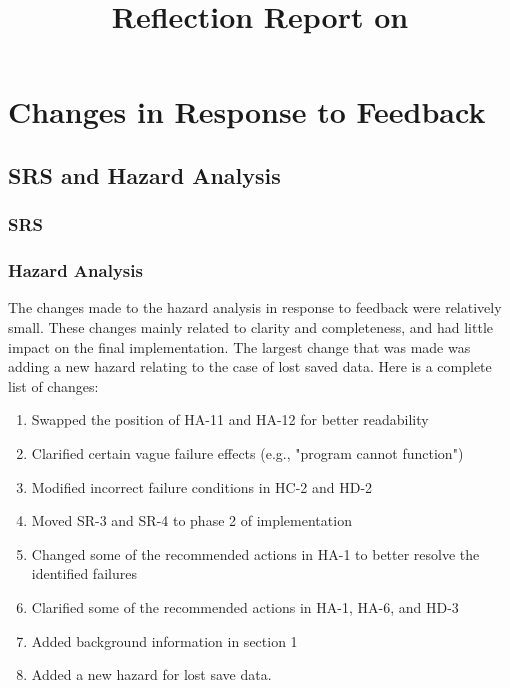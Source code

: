 \documentclass{article}
\title{Reflection Report on \progname}
\author{\authname}
\date{}
\begin{document}
\maketitle


\section{Changes in Response to Feedback}



\subsection{SRS and Hazard Analysis}
\subsubsection{SRS}

\subsubsection{Hazard Analysis}
The changes made to the hazard analysis in response to feedback were relatively small. These changes mainly related to clarity and completeness, and had little impact on the final implementation. The largest change that was made was adding a new hazard relating to the case of lost saved data. Here is a complete list of changes:
\begin{enumerate}
  \item Swapped the position of HA-11 and HA-12 for better readability
  \item Clarified certain vague failure effects (e.g., "program cannot function")
  \item Modified incorrect failure conditions in HC-2 and HD-2
  \item Moved SR-3 and SR-4 to phase 2 of implementation
  \item Changed some of the recommended actions in HA-1 to better resolve the identified failures
  \item Clarified some of the recommended actions in HA-1, HA-6, and HD-3
  \item Added background information in section 1
  \item Added a new hazard for lost save data. 
\end{enumerate}
\end{document}
